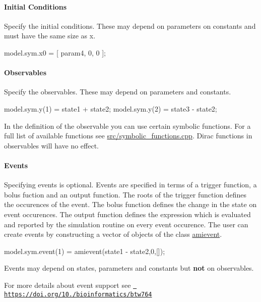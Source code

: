\paragraph*{Initial Conditions}

Specify the initial conditions. These may depend on parameters on constants and must have the same size as {\ttfamily x}. \begin{DoxyVerb}model.sym.x0 = [ param4, 0, 0 ];
\end{DoxyVerb}


\paragraph*{Observables}

Specify the observables. These may depend on parameters and constants. \begin{DoxyVerb}model.sym.y(1) = state1 + state2;
model.sym.y(2) = state3 - state2;
\end{DoxyVerb}


In the definition of the observable you can use certain symbolic functions. For a full list of available functions see {\ttfamily \mbox{\hyperlink{symbolic__functions_8cpp}{src/symbolic\+\_\+functions.\+cpp}}}. Dirac functions in observables will have no effect.

\paragraph*{Events}

Specifying events is optional. Events are specified in terms of a trigger function, a bolus fuction and an output function. The roots of the trigger function defines the occurences of the event. The bolus function defines the change in the state on event occurences. The output function defines the expression which is evaluated and reported by the simulation routine on every event occurence. The user can create events by constructing a vector of objects of the class \mbox{\hyperlink{classamievent}{amievent}}. \begin{DoxyVerb}model.sym.event(1) = amievent(state1 - state2,0,[]);
\end{DoxyVerb}


Events may depend on states, parameters and constants but {\bfseries{not}} on observables.

For more details about event support see \href{https://doi.org/10.1093/bioinformatics/btw764}{\texttt{ https\+://doi.\+org/10./bioinformatics/btw764}}

